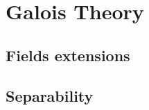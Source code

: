 \documentclass[main.tex]{subfiles}
\begin{document}
	\chapter{Galois Theory}
		\section{Fields extensions}
		
		\section{Separability}	
\end{document}
